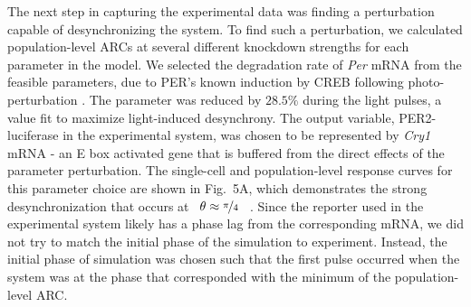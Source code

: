 \documentclass[11pt, letterpaper]{article}
\providecommand{\DIFadd}[1]{{\protect\color{blue}#1}} %
\providecommand{\DIFaddbegin}{} %
\providecommand{\DIFaddend}{} %
\begin{document}
\DIFadd{The next step in capturing the experimental data was finding a perturbation capable of desynchronizing the system.
To find such a perturbation, we calculated population-level ARCs at several different knockdown strengths for each parameter in the model.
We selected the }\DIFaddend degradation rate of {\itshape Per} mRNA \DIFaddbegin \DIFadd{from the feasible parameters}\DIFaddend , due to PER's known induction by CREB following photo-perturbation \cite{Tischkau2003}.
The parameter was reduced by $28.5\%$ during the light pulses, a value fit to maximize light-induced desynchrony.
The output variable, PER2-luciferase in the experimental system, was chosen to be represented by {\itshape Cry1} mRNA - an E box activated gene \DIFaddbegin \DIFadd{that }\DIFaddend is buffered from the direct effects of the parameter perturbation.
\DIFaddbegin \DIFadd{The single-cell and population-level response curves for this parameter choice are shown in Fig.~5A, which demonstrates the strong desynchronization that occurs at \mbox{%
$\theta\approx\nicefrac{\pi}{4}$
}%
.
Since the reporter used in the experimental system likely has a phase lag from the corresponding mRNA, we did not try to match the initial phase of the simulation to experiment.
Instead, the initial phase of simulation was chosen such that the first pulse occurred when the system was at the phase that corresponded with the minimum of the population-level ARC.
}\DIFaddend 
\end{document}

